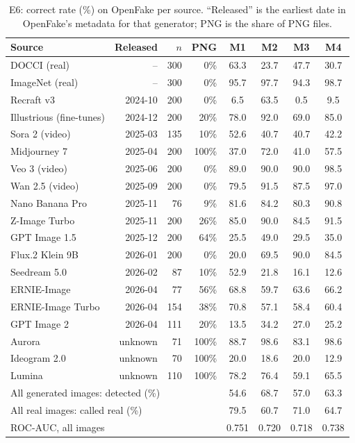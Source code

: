 \documentclass{mnnit}
\begin{document}
\begin{table}[htbp]
\centering
\caption{E6: correct rate (\%) on OpenFake per source. ``Released'' is the earliest date in OpenFake's metadata for that generator; PNG is the share of PNG files.}
\label{tab:e6}
\scriptsize
\begin{tabular}{lrrr|cccc}
\toprule
\textbf{Source} & \textbf{Released} & \textbf{$n$} & \textbf{PNG} & \textbf{M1} & \textbf{M2} & \textbf{M3} & \textbf{M4}\\
\midrule
DOCCI (real) & -- & 300 & 0\% & 63.3 & 23.7 & 47.7 & 30.7\\
ImageNet (real) & -- & 300 & 0\% & 95.7 & 97.7 & 94.3 & 98.7\\
\midrule
Recraft v3 & 2024-10 & 200 & 0\% & 6.5 & 63.5 & 0.5 & 9.5\\
Illustrious (fine-tunes) & 2024-12 & 200 & 20\% & 78.0 & 92.0 & 69.0 & 85.0\\
Sora 2 (video) & 2025-03 & 135 & 10\% & 52.6 & 40.7 & 40.7 & 42.2\\
Midjourney 7 & 2025-04 & 200 & 100\% & 37.0 & 72.0 & 41.0 & 57.5\\
Veo 3 (video) & 2025-06 & 200 & 0\% & 89.0 & 90.0 & 90.0 & 98.5\\
Wan 2.5 (video) & 2025-09 & 200 & 0\% & 79.5 & 91.5 & 87.5 & 97.0\\
Nano Banana Pro & 2025-11 & 76 & 9\% & 81.6 & 84.2 & 80.3 & 90.8\\
Z-Image Turbo & 2025-11 & 200 & 26\% & 85.0 & 90.0 & 84.5 & 91.5\\
GPT Image 1.5 & 2025-12 & 200 & 64\% & 25.5 & 49.0 & 29.5 & 35.0\\
Flux.2 Klein 9B & 2026-01 & 200 & 0\% & 20.0 & 69.5 & 90.0 & 84.5\\
Seedream 5.0 & 2026-02 & 87 & 10\% & 52.9 & 21.8 & 16.1 & 12.6\\
ERNIE-Image & 2026-04 & 77 & 56\% & 68.8 & 59.7 & 63.6 & 66.2\\
ERNIE-Image Turbo & 2026-04 & 154 & 38\% & 70.8 & 57.1 & 58.4 & 60.4\\
GPT Image 2 & 2026-04 & 111 & 20\% & 13.5 & 34.2 & 27.0 & 25.2\\
Aurora & unknown & 71 & 100\% & 88.7 & 98.6 & 83.1 & 98.6\\
Ideogram 2.0 & unknown & 70 & 100\% & 20.0 & 18.6 & 20.0 & 12.9\\
Lumina & unknown & 110 & 100\% & 78.2 & 76.4 & 59.1 & 65.5\\
\midrule
\multicolumn{4}{l}{All generated images: detected (\%)} & 54.6 & 68.7 & 57.0 & 63.3\\
\multicolumn{4}{l}{All real images: called real (\%)} & 79.5 & 60.7 & 71.0 & 64.7\\
\multicolumn{4}{l}{\mbox{ROC-AUC}, all images} & 0.751 & 0.720 & 0.718 & 0.738\\
\bottomrule
\end{tabular}
\end{table}
\end{document}
